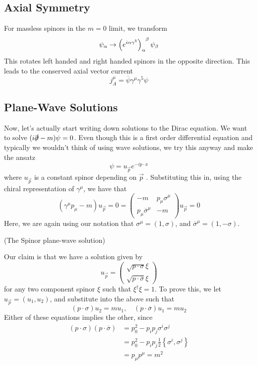 \subsection{Axial Symmetry} 
For massless spinors in the $ m = 0 $ limit, 
we transform 
\[
\psi _{ \alpha } \to \left(  e ^{ i \alpha \gamma ^ 5 }  \right) \indices{ _ \alpha ^ \beta }
\psi _ \beta 
\] This rotates left handed and right handed spinors in the 
opposite direction. This leads to 
the conserved axial vector current 
\[
j _ A ^ \mu  = \overline{ \psi  } \gamma ^ \mu \gamma ^ 5 \psi 
\] 

\subsection{Plane-Wave Solutions}
Now, let's actually start writing down solutions to the 
Dirac equation. 
We want to solve $ ( i \slashed{\partial}  -m ) \psi = 0 $. 
Even though this is a first order differential equation 
and typically we wouldn't think of using wave solutions, 
we try this anyway and make the ansatz 
\[
\psi = u_{ \vec{p} } e ^{ - i p \cdot  x }
\] where $ u _{ \vec{p} }  $ is a constant spinor 
depending on $ \vec{p} $ . 
Substituting this in, using the chiral representation
of $ \gamma ^ \mu $, we have that 
\[
( \gamma ^ \mu p _ \mu - m ) u _{ \vec{p} }  = 0  = 
\begin{pmatrix}  - m & p _ \mu \sigma ^ \mu \\ p _ \mu \overline{ \sigma } ^ \mu 
& - m  \end{pmatrix} u _{ \vec{p} }  =0 
\] Here, we are again using 
our notation that $ \sigma^ \mu = ( 1 , \sigma ) $, and $ \overline{ \sigma } ^ \mu  = ( 1 , - \sigma ) $. 

\begin{claim}{(The Spinor plane-wave solution)}
	
\end{claim}
Our claim is that we have a solution 
given by 
\[
u _{ \vec{p} }  = \begin{pmatrix}  \sqrt{ p \cdot  \sigma }  \xi \\
\sqrt{ p \cdot  \overline{ \sigma } }  \xi \end{pmatrix} 
\] for any two component spinor $ \xi $ such that $ \xi ^ \dagger \xi = 1 $. 
To prove this, we let  $ u _ { \vec{p} } = ( u _ 1, u _ 2 ) $, and 
substitute into the above such that 
\[
( p \cdot  \sigma ) u _ 2 = m u _1 , \quad ( p \cdot  \overline{ \sigma } ) u _ 1 
 = m u _ 2 
\] Either of these equations implies the other, since 
\begin{align*}
( p \cdot  \sigma ) ( p \cdot  \overline{ \sigma } ) &=  
p_0^ 2 - p _ i p _ j \sigma ^ i \sigma ^ j \\
&=   p_0 ^ 2  - p _ i p_ j \frac{1}{2 } \left\{  \sigma ^ i , \sigma ^ j  \right\}  \\
&=  p _\mu p ^ \mu   = m ^ 2  
\end{align*}

